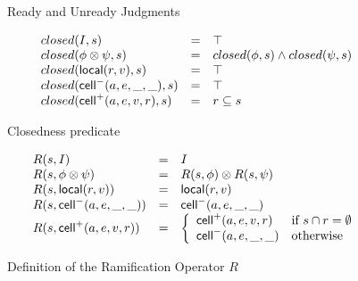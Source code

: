 \begin{figure}
\caption{Ready and Unready Judgments}
\label{readiness}
\end{figure}

\begin{figure}
  \begin{displaymath}
    \begin{array}{lcl}
      closed(I, s) & = & \top \\
      closed(\phi \otimes \psi, s) & = & closed(\phi, s) \land closed(\psi, s) \\ 
      closed(\mathsf{local}({r}, {v}), s) & = & \top \\
      closed(\mathsf{cell}^{-}({a}, {e}, {\_}, {\_}), s) & = & \top \\
      closed(\mathsf{cell}^{+}({a}, {e}, {v}, {r}), s) & = & r \subseteq s \\
    \end{array}
  \end{displaymath}
\caption{Closedness predicate}
\label{closedness}  
\end{figure}

\begin{figure}
  \begin{displaymath}
    \begin{array}{lcl}
      R(s, I)                 & = & I \\
      R(s, \phi \otimes \psi) & = & R(s, \phi) \otimes R(s, \psi) \\
      R(s, \mathsf{local}({r}, {v}))   & = & \mathsf{local}({r}, {v}) \\
      R(s, \mathsf{cell}^{-}({a}, {e}, {\_}, {\_}))    & = & \mathsf{cell}^{-}({a}, {e}, {\_}, {\_}) \\
      R(s, \mathsf{cell}^{+}({a}, {e}, {v}, {r})) & = & \left\{\begin{array}{ll}
                                                \mathsf{cell}^{+}({a}, {e}, {v}, {r}) 
                                              & \mbox{if } s \cap r = \emptyset \\
                                                \mathsf{cell}^{-}({a}, {e}, {\_}, {\_})
                                              & \mbox{otherwise}
                                              \end{array}
                                       \right.
    \end{array}
  \end{displaymath}
\caption{Definition of the Ramification Operator $R$}
\label{ramify-def}
\end{figure}

